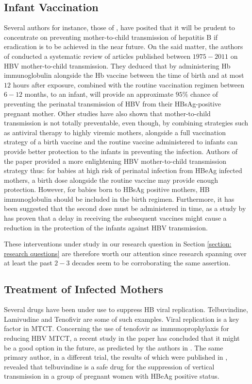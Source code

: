\subsection{Infant Vaccination}
Several authors for instance, those of \cite{tran2009management,andersson2015mother, xu2013nextstep,shimakawa2016mother}, have posited that it will be prudent to concentrate on preventing mother-to-child transmission of hepatitis B if eradication is to be achieved in the near future. On the said matter, the authors of \cite{Pan2012} conducted a systematic review of articles published between $1975-2011$ on HBV mother-to-child transmission. They deduced that by administering Hb immunoglobulin alongside the Hb vaccine between the time of birth and at most $12$ hours after exposure, combined with the routine vaccination regimen between $6-12$ months, to an infant, will provide an approximate $95\%$ chance of preventing the perinatal transmission of HBV from their HBsAg-positive pregnant mother. Other studies have also shown that mother-to-child transmission is not totally preventable, even though, by combining strategies such as antiviral therapy to highly viremic mothers, alongside a full vaccination strategy of a birth vaccine and the routine vaccine administered to infants can provide better protection to the infants\cite{tran2009management} in preventing the infection. Authors of the paper \cite{tran2009management} provided a more enlightening HBV mother-to-child transmission strategy thus: for babies at high risk of perinatal infection from HBeAg infected mothers, a birth dose alongside the routine vaccine may provide enough protection. However, for babies born to HBsAg positive mothers, HB immunoglobulin should be included in the birth regimen. Furthermore, it has been suggested that the second dose must be administered in time, as a study by \cite{tharmaphornpilas2009increasedRisk} has proven that a delay in receiving the subsequent vaccines might cause a reduction in the protection of the infants against HBV transmission. 

These interventions under study in our research question in Section \ref{section: research questions} are therefore worth our attention since research spanning over at least the past $2-3$ decades seem to be corroborating the same assertion. 

\subsection{Treatment of Infected Mothers}
Several drugs have been under use to suppress HB viral replication. Telbuvindine, Lamivudine and Tenofivir are some of such examples. Viral replication is a key factor in MTCT. Concerning the use of tenofovir as immunoprophylaxis for reducing HBV MTCT, a recent study in the paper \cite{pan2016TenofivirToPrevent} has concluded that it might be a good option in the future, as predicted by the authors in \cite{xu2013nextstep}. The same primary author, in a different trial, the results of which were published in \cite{pan2012telbivudine}, revealed that telbuvindine is a safe drug for the suppression of vertical transmission in a group of pregnant women with HBeAg positive status.